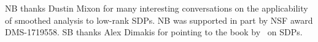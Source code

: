 NB thanks Dustin Mixon for many interesting conversations on the applicability of smoothed analysis to low-rank SDPs. NB was supported in part by NSF award DMS-1719558. SB thanks Alex Dimakis for pointing to the book by~\citet{gartner2012approximation} on SDPs.
